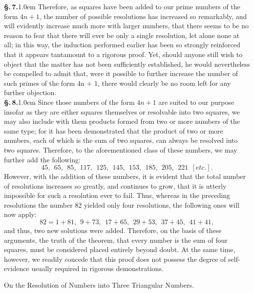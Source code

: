 \documentclass[12pt]{article}
\newcommand{\heading}[1]{%
  \par\addvspace{2.0ex plus .5ex minus .3ex}%
  {\centering\large #1\par}%
  \addvspace{1.0ex plus .3ex minus .2ex}}
\newcommand{\pnum}[1]{\textbf{\S.\,#1.}\kern1.0em}
\begin{document}
\vspace{0.3cm}

\pnum{7} Therefore, as squares have been added to our prime numbers of the form $4n + 1$, the number of possible resolutions has increased so remarkably, and will evidently increase much more with larger numbers, that there seems to be no reason to fear that there will ever be only a single resolution, let alone none at all; in this way, the induction performed earlier has been so strongly reinforced that it appears tantamount to a rigorous proof. Yet, should anyone still wish to object that the matter has not been sufficiently established, he would nevertheless be compelled to admit that, were it possible to further increase the number of such primes of the form 4n + 1, there would clearly be no room left for any further objection. \\

\pnum{8} Since those numbers of the form $4n + 1$ are suited to our purpose insofar as they are either squares themselves or resolvable into two squares, we may also include with them products formed from two or more numbers of the same type; for it has been demonstrated that the product of two or more numbers, each of which is the sum of two squares, can always be resolved into two squares. Therefore, to the aforementioned class of these numbers, we may further add the following: 
$$45, \ \ 65,\ \ 85,\ \ 117,\ \ 125,\ \ 145,\ \ 153,\ \ 185,\ \ 205,\ \ 221\ \ [etc.].$$
However, with the addition of these numbers, it is evident that the total number of resolutions increases so greatly, and continues to grow, that it is utterly impossible for such a resolution ever to fail. Thus, whereas in the preceding resolutions the number 82 yielded only four resolutions, the following ones will now apply:
$$82=1+ 81, \ \ 9 + 73,\ \ 17 +65,\ \ 29 + 53,\ \ 37 + 45,\ \ 41 + 41,$$
and thus, two new solutions were added. Therefore, on the basis of these arguments, the truth of the theorem, that every number is the sum of four squares, must be considered placed entirely beyond doubt. At the same time, however, we readily concede that this proof does not possess the degree of self-evidence usually required in rigorous demonstrations. \\

\heading{On the Resolution of Numbers into Three Triangular Numbers.}
\end{document}
